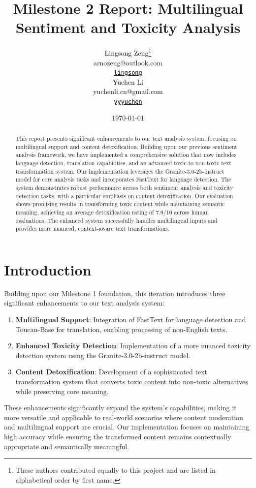 \documentclass[11pt]{article}
\title{Milestone 2 Report: Multilingual Sentiment and Toxicity Analysis}
\author{
    \textcolor{black}{Lingsong Zeng}\thanks{These authors contributed equally to this project and are listed in alphabetical order by first name.} \\ 
    arnozeng@outlook.com \\
      \texttt{\href{https://github.ubc.ca/lingsong}{\textcolor{black}{\faGithub \space lingsong}}}
 \\\And
    \textcolor{black}{Yuchen Li}\footnotemark[1] \\ 
    yuchenli.cn@gmail.com \\ 
  \texttt{\href{https://github.ubc.ca/yyyuchen}{\textcolor{black}{\faGithub \space yyyuchen}}}
}
\date{\today} %
\begin{document}
\maketitle

\begin{abstract}
This report presents significant enhancements to our text analysis system, focusing on multilingual support and content detoxification. Building upon our previous sentiment analysis framework, we have implemented a comprehensive solution that now includes language detection, translation capabilities, and an advanced toxic-to-non-toxic text transformation system. Our implementation leverages the Granite-3.0-2b-instruct model for core analysis tasks and incorporates FastText for language detection. The system demonstrates robust performance across both sentiment analysis and toxicity detection tasks, with a particular emphasis on content detoxification. Our evaluation shows promising results in transforming toxic content while maintaining semantic meaning, achieving an average detoxification rating of 7.9/10 across human evaluations. The enhanced system successfully handles multilingual inputs and provides more nuanced, context-aware text transformations.
\end{abstract}

\section{Introduction}
Building upon our Milestone 1 foundation, this iteration introduces three significant enhancements to our text analysis system:

\begin{enumerate}
    \item \textbf{Multilingual Support}: Integration of FastText for language detection and Toucan-Base for translation, enabling processing of non-English texts.
    \item \textbf{Enhanced Toxicity Detection}: Implementation of a more nuanced toxicity detection system using the Granite-3.0-2b-instruct model.
    \item \textbf{Content Detoxification}: Development of a sophisticated text transformation system that converts toxic content into non-toxic alternatives while preserving core meaning.
\end{enumerate}

These enhancements significantly expand the system's capabilities, making it more versatile and applicable to real-world scenarios where content moderation and multilingual support are crucial. Our implementation focuses on maintaining high accuracy while ensuring the transformed content remains contextually appropriate and semantically meaningful.
\end{document}
